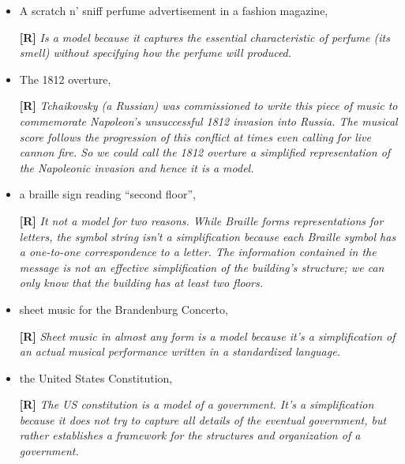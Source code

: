 \begin{enumerate}
\begin{itemize}
  \item A scratch n' sniff perfume advertisement in a fashion magazine,

    \begin{onlysolution}
      \textbf{[R]}
      \itshape
      Is a model because it captures the essential characteristic of perfume 
      (its smell) without specifying how the perfume will produced.
    \end{onlysolution}

  \item The 1812 overture,

    \begin{onlysolution}
      \textbf{[R]}
      \itshape
      Tchaikovsky (a Russian) was commissioned to write this piece of music to commemorate 
      Napoleon’s unsuccessful 1812 invasion into Russia. The musical score follows the 
      progression of this conflict at times even calling for live cannon fire. So we could 
      call the 1812 overture a simplified representation of the Napoleonic invasion and 
      hence it is a model.
    \end{onlysolution}

  \item a braille sign reading ``second floor'',

    \begin{onlysolution}
      \textbf{[R]}
      \itshape
      It not a model for two reasons. While Braille forms representations for letters, the 
      symbol string isn’t a simplification because each Braille symbol has a one-to-one 
      correspondence to a letter. The information contained in the message is not an effective 
      simplification of the building’s structure; we can only know that the building has at 
      least two floors.
    \end{onlysolution}

  \item sheet music for the Brandenburg Concerto, 

    \begin{onlysolution}
      \textbf{[R]}
      \itshape
      Sheet music in almost any form is a model because it’s a simplification of an actual 
      musical performance written in a standardized language.
    \end{onlysolution}

  \item the United States Constitution, 

    \begin{onlysolution}
      \textbf{[R]}
      \itshape
      The US constitution is a model of a government. It’s a simplification because it 
      does not try to capture all details of the eventual government, but rather establishes 
      a framework for the structures and organization of a government.
    \end{onlysolution}


\end{itemize}
\end{enumerate}
